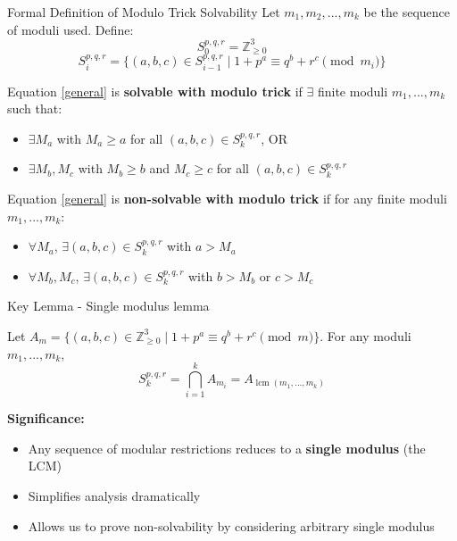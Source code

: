 \begin{frame}{Formal Definition of Modulo Trick Solvability}
    Let $m_1,m_2,...,m_k$ be the sequence of moduli used. Define:
    \[S_0^{p,q,r} = \mathbb{Z}_{\geq 0}^3\]
    \[S_i^{p,q,r} = \{(a,b,c)\in S_{i-1}^{p,q,r} \; | \; 1+p^a \equiv q^b+r^c \pmod{m_i}\}\]

    \begin{Definitionn}
        Equation \eqref{general} is \textbf{solvable with modulo trick} if $\exists$ finite moduli $m_1,...,m_k$ such that:
        \begin{itemize}
            \item $\exists M_a$ with $M_a \geq a$ for all $(a,b,c) \in S_k^{p,q,r}$, OR
            \item $\exists M_b,M_c$ with $M_b \geq b$ and $M_c \geq c$ for all $(a,b,c) \in S_k^{p,q,r}$
        \end{itemize}
    \end{Definitionn}

    \begin{Definitionn}
        Equation \eqref{general} is \textbf{non-solvable with modulo trick} if for any finite moduli $m_1,...,m_k$:
        \begin{itemize}
            \item $\forall M_a$, $\exists (a,b,c) \in S_k^{p,q,r}$ with $a > M_a$
            \item $\forall M_b,M_c$, $\exists (a,b,c) \in S_k^{p,q,r}$ with $b > M_b$ or $c > M_c$
        \end{itemize}
    \end{Definitionn}
\end{frame}

\begin{frame}{Key Lemma - Single modulus lemma}
    \begin{lemmas}
        Let $A_m = \{(a,b,c) \in \mathbb{Z}_{\geq 0}^3 \; | \; 1+p^a \equiv q^b+r^c \pmod{m}\}$.
        For any moduli $m_1,...,m_k$,
        \[S_k^{p,q,r} = \bigcap_{i=1}^k A_{m_i} = A_{\operatorname{lcm}(m_1,...,m_k)}\]
    \end{lemmas}

    \textbf{Significance:}
    \begin{itemize}
        \item Any sequence of modular restrictions reduces to a \textbf{single modulus} (the LCM)
        \item Simplifies analysis dramatically
        \item Allows us to prove non-solvability by considering arbitrary single modulus
    \end{itemize}
\end{frame}

